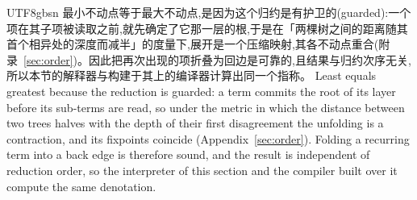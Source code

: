 \begin{CJK*}{UTF8}{gbsn}
  \ifTablambdaChinese
  \noindent 最小不动点等于最大不动点,是因为这个归约是有护卫的(guarded):一个项在其子项被读取之前,就先确定了它那一层的根,于是在「两棵树之间的距离随其首个相异处的深度而减半」的度量下,展开是一个压缩映射,其各不动点重合(附录~\ref{sec:order})。因此把再次出现的项折叠为回边是可靠的,且结果与归约次序无关,所以本节的解释器与构建于其上的编译器计算出同一个指称。
  \else
  \noindent Least equals greatest because the reduction is guarded: a term commits the root of its layer before its sub-terms are read, so under the metric in which the distance between two trees halves with the depth of their first disagreement the unfolding is a contraction, and its fixpoints coincide (Appendix~\ref{sec:order}). Folding a recurring term into a back edge is therefore sound, and the result is independent of reduction order, so the interpreter of this section and the compiler built over it compute the same denotation.
  \fi


\end{CJK*}

